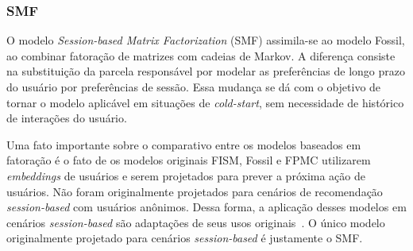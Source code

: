 \subsubsection{SMF}
 O modelo
\textit{Session-based Matrix Factorization} (SMF) \cite{ludewig_2018}
assimila-se ao modelo Fossil, ao combinar fatoração de matrizes com cadeias de
Markov. A diferença consiste na substituição da parcela responsável por modelar
as preferências de longo prazo do usuário por preferências de sessão. Essa
mudança se dá com o objetivo de tornar o modelo aplicável em situações de
\textit{cold-start}, sem necessidade de histórico de interações do usuário.

Uma fato importante sobre o comparativo entre os modelos baseados em fatoração é
o fato de os modelos originais FISM, Fossil e FPMC utilizarem
\textit{embeddings} de usuários e serem projetados para prever a próxima ação de
usuários. Não foram originalmente projetados para cenários de recomendação
\textit{session-based} com usuários anônimos. Dessa forma, a aplicação desses
modelos em cenários \textit{session-based} são adaptações de seus usos
originais~\cite{ludewig2020advances}. O único modelo originalmente projetado
para cenários \textit{session-based} é justamente o SMF.






